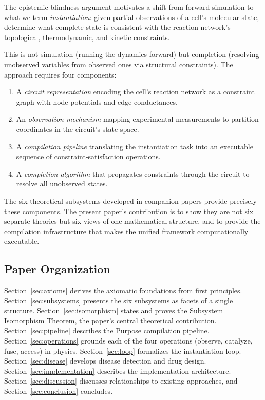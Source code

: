 \documentclass[twocolumn,10pt,a4paper]{article}
\theoremstyle{definition}
\theoremstyle{remark}
\begin{document}
The epistemic blindness argument motivates a shift from forward simulation to what we term \emph{instantiation}: given partial observations of a cell's molecular state, determine what complete state is consistent with the reaction network's topological, thermodynamic, and kinetic constraints.

This is not simulation (running the dynamics forward) but completion (resolving unobserved variables from observed ones via structural constraints). The approach requires four components:

\begin{enumerate}[label=(\alph*)]
    \item A \emph{circuit representation} encoding the cell's reaction network as a constraint graph with node potentials and edge conductances.
    \item An \emph{observation mechanism} mapping experimental measurements to partition coordinates in the circuit's state space.
    \item A \emph{compilation pipeline} translating the instantiation task into an executable sequence of constraint-satisfaction operations.
    \item A \emph{completion algorithm} that propagates constraints through the circuit to resolve all unobserved states.
\end{enumerate}

The six theoretical subsystems developed in companion papers \citep{Sachikonye2024a,Sachikonye2024b,Sachikonye2024c,Sachikonye2024d,Sachikonye2024e,Sachikonye2024f} provide precisely these components. The present paper's contribution is to show they are not six separate theories but six views of one mathematical structure, and to provide the compilation infrastructure that makes the unified framework computationally executable.

\subsection{Paper Organization}

Section~\ref{sec:axioms} derives the axiomatic foundations from first principles. Section~\ref{sec:subsystems} presents the six subsystems as facets of a single structure. Section~\ref{sec:isomorphism} states and proves the Subsystem Isomorphism Theorem, the paper's central theoretical contribution. Section~\ref{sec:pipeline} describes the Purpose compilation pipeline. Section~\ref{sec:operations} grounds each of the four operations (observe, catalyze, fuse, access) in physics. Section~\ref{sec:loop} formalizes the instantiation loop. Section~\ref{sec:disease} develops disease detection and drug design. Section~\ref{sec:implementation} describes the implementation architecture. Section~\ref{sec:discussion} discusses relationships to existing approaches, and Section~\ref{sec:conclusion} concludes.
\end{document}
